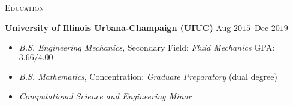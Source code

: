 \documentclass[10pt]{article}
\begin{document}
%

\begin{multicols}{2}
\textsc{Education}
\columnbreak

%
%
%
\textbf{University of Illinois Urbana-Champaign (UIUC)} \hfill Aug $2015$--Dec $2019$

\vspace{-1.75em}
\begin{itemize}[label= ]
    \setlength\itemsep{-0.25em}
    \setlength{\itemindent}{-1.50em}
    \item \textit{B.S. Engineering Mechanics}, Secondary Field: \textit{Fluid Mechanics} \hfill GPA: $3.66/4.00$
    \item \textit{B.S. Mathematics}, Concentration: \textit{Graduate Preparatory} \hfill (dual degree)
    \item \textit{Computational Science and Engineering Minor}
\end{itemize}
\vspace{-2.0em}

\end{multicols}
\end{document}
